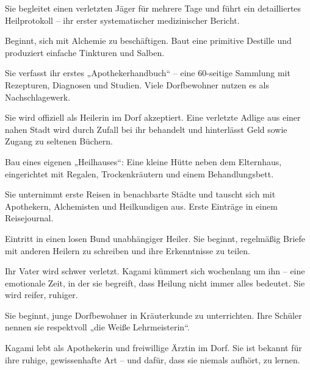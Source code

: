\documentclass[12pt,a4paper]{article}
\begin{document}
\begin{multicols}{2}
\begin{description}[leftmargin=1.5cm, style=nextline, font=\normalfont\bfseries]
\item[16 Jahre]  
Sie begleitet einen verletzten Jäger für mehrere Tage und führt ein detailliertes Heilprotokoll – ihr erster systematischer medizinischer Bericht.

\item[17 Jahre]  
Beginnt, sich mit Alchemie zu beschäftigen. Baut eine primitive Destille und produziert einfache Tinkturen und Salben.

\item[18 Jahre]  
Sie verfasst ihr erstes „Apothekerhandbuch“ – eine 60-seitige Sammlung mit Rezepturen, Diagnosen und Studien. Viele Dorfbewohner nutzen es als Nachschlagewerk.

\item[19 Jahre]  
Sie wird offiziell als Heilerin im Dorf akzeptiert. Eine verletzte Adlige aus einer nahen Stadt wird durch Zufall bei ihr behandelt und hinterlässt Geld sowie Zugang zu seltenen Büchern.

\item[20 Jahre]  
Bau eines eigenen „Heilhauses“: Eine kleine Hütte neben dem Elternhaus, eingerichtet mit Regalen, Trockenkräutern und einem Behandlungsbett.

\item[21 Jahre]  
Sie unternimmt erste Reisen in benachbarte Städte und tauscht sich mit Apothekern, Alchemisten und Heilkundigen aus. Erste Einträge in einem Reisejournal.

\item[22 Jahre]  
Eintritt in einen losen Bund unabhängiger Heiler. Sie beginnt, regelmäßig Briefe mit anderen Heilern zu schreiben und ihre Erkenntnisse zu teilen.

\item[23 Jahre]  
Ihr Vater wird schwer verletzt. Kagami kümmert sich wochenlang um ihn – eine emotionale Zeit, in der sie begreift, dass Heilung nicht immer alles bedeutet. Sie wird reifer, ruhiger.

\item[24 Jahre]  
Sie beginnt, junge Dorfbewohner in Kräuterkunde zu unterrichten. Ihre Schüler nennen sie respektvoll „die Weiße Lehrmeisterin“.

\item[25 Jahre (Gegenwart)]  
Kagami lebt als Apothekerin und freiwillige Ärztin im Dorf. Sie ist bekannt für ihre ruhige, gewissenhafte Art – und dafür, dass sie niemals aufhört, zu lernen.

\end{description}
\end{multicols}
\end{document}
